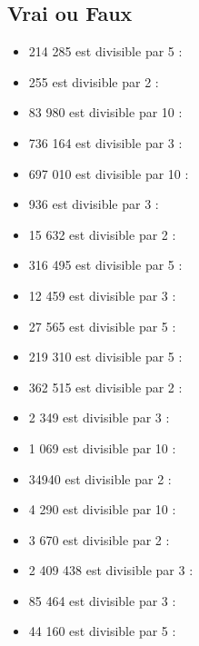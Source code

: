      \subsection*{Vrai ou Faux}
      \begin{multicols}{2}
      \begin{itemize}
        \item 214 285 est divisible par 5 : \dotfill \\
        \item 255 est divisible par 2 : \dotfill \\
        \item 83 980 est divisible par 10 : \dotfill \\
        \item 736 164 est divisible par 3 : \dotfill \\
        \item 697 010 est divisible par 10 : \dotfill \\
        \item 936 est divisible par 3 : \dotfill \\
        \item 15 632 est divisible par 2 : \dotfill \\
        \item 316 495 est divisible par 5 : \dotfill \\
        \item 12 459 est divisible par 3 : \dotfill \\
        \item 27 565 est divisible par 5 : \dotfill \\
        \item  219 310 est divisible par 5 : \dotfill \\
        \item 362 515 est divisible par 2 : \dotfill \\
       \item 2 349 est divisible par 3 : \dotfill \\
       \item 1 069 est divisible par 10 : \dotfill \\
       \item 34940 est divisible par 2 : \dotfill \\
       \item 4 290 est divisible par 10 : \dotfill \\
       \item 3 670 est divisible par 2 : \dotfill \\
       \item 2 409 438 est divisible par 3 : \dotfill \\
       \item 85 464 est divisible par 3 : \dotfill \\
       \item 44 160 est divisible par 5 : \dotfill \\
      \end{itemize}
    \end{multicols}

